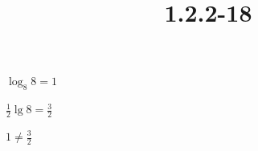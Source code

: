 \documentclass{article}
\title{1.2.2-18}
\begin{document}
\maketitle

$\log_8{8} = 1$

$\frac{1}{2}\lg{8} = \frac{3}{2}$

$1 \neq \frac{3}{2}$
\end{document}
